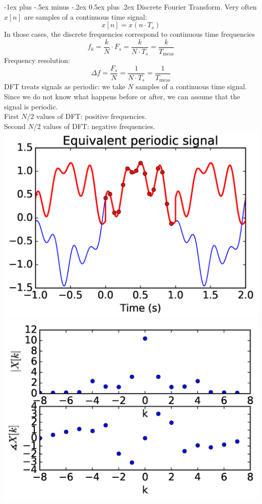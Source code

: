 \documentclass[10pt,landscape,a4paper]{article}
\makeatletter
\renewcommand{\section}{\@startsection{section}{1}{0mm}%
	{-1ex plus -.5ex minus -.2ex}%
	{0.5ex plus .2ex}%
	{\normalfont\large\bfseries}}
\makeatother
\begin{document}
\begin{multicols}{3}
		\section{Discrete Fourier Transform.}
		Very often $ x[n] $ are samples of a continuous time signal:
		\[
			x[n] = x(n\cdot T_s)
		\]
		In those cases, the discrete frequencies correspond to continuous time frequencies
		\[
			f_k = \frac{k}{N}\cdot F_s = \frac{k}{N\cdot T_s} = \frac{k}{T_{\text{meas}}}
		\]
		Frequency resolution:
		\[
			\Delta f=\frac{F_s}{N}=\frac{1}{N\cdot T_s}=\frac{1}{T_{\text{meas}}}
		\]
		DFT treats signals as periodic: we take $ N $ samples of a continuous time signal. Since we do not know what happens before or after, we can assume that the signal is periodic.\\
		First $ N/2 $ values of DFT: positive frequencies.\\
		Second $ N/2 $ values of DFT: negative frequencies.\\
		\includegraphics[width=\textwidth/5]{dft-equivalent-signal}\\
		\includegraphics[width=\textwidth/5]{dft-result}\\
		

\end{multicols}
\end{document}
